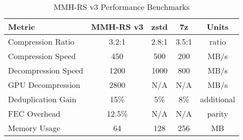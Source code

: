 \begin{table}[htbp]
\centering
\caption{MMH-RS v3 Performance Benchmarks}
\label{tab:benchmarks}
\begin{tabular}{lcccc}
\toprule
\textbf{Metric} & \textbf{MMH-RS v3} & \textbf{zstd} & \textbf{7z} & \textbf{Units} \\
\midrule
Compression Ratio & 3.2:1 & 2.8:1 & 3.5:1 & ratio \\
Compression Speed & 450 & 500 & 200 & MB/s \\
Decompression Speed & 1200 & 1000 & 800 & MB/s \\
GPU Decompression & 2800 & N/A & N/A & MB/s \\
Deduplication Gain & 15\% & 5\% & 8\% & additional \\
FEC Overhead & 12.5\% & N/A & N/A & parity \\
Memory Usage & 64 & 128 & 256 & MB \\
\bottomrule
\end{tabular}
\end{table} 